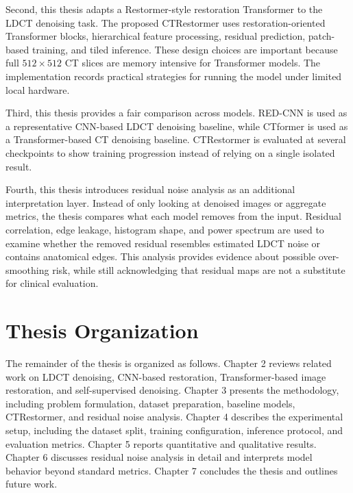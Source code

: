 Second, this thesis adapts a Restormer-style restoration Transformer to the LDCT denoising task. The proposed CTRestormer uses restoration-oriented Transformer blocks, hierarchical feature processing, residual prediction, patch-based training, and tiled inference. These design choices are important because full \(512 \times 512\) CT slices are memory intensive for Transformer models. The implementation records practical strategies for running the model under limited local hardware.

Third, this thesis provides a fair comparison across models. RED-CNN is used as a representative CNN-based LDCT denoising baseline, while CTformer is used as a Transformer-based CT denoising baseline. CTRestormer is evaluated at several checkpoints to show training progression instead of relying on a single isolated result.

Fourth, this thesis introduces residual noise analysis as an additional interpretation layer. Instead of only looking at denoised images or aggregate metrics, the thesis compares what each model removes from the input. Residual correlation, edge leakage, histogram shape, and power spectrum are used to examine whether the removed residual resembles estimated LDCT noise or contains anatomical edges. This analysis provides evidence about possible over-smoothing risk, while still acknowledging that residual maps are not a substitute for clinical evaluation.

\section{Thesis Organization}

The remainder of the thesis is organized as follows. Chapter 2 reviews related work on LDCT denoising, CNN-based restoration, Transformer-based image restoration, and self-supervised denoising. Chapter 3 presents the methodology, including problem formulation, dataset preparation, baseline models, CTRestormer, and residual noise analysis. Chapter 4 describes the experimental setup, including the dataset split, training configuration, inference protocol, and evaluation metrics. Chapter 5 reports quantitative and qualitative results. Chapter 6 discusses residual noise analysis in detail and interprets model behavior beyond standard metrics. Chapter 7 concludes the thesis and outlines future work.
